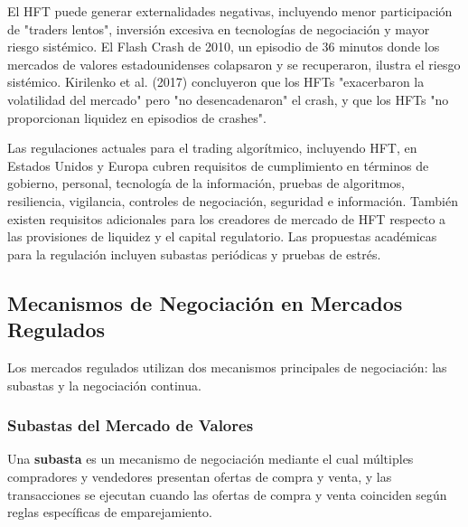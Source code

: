 \begin{proposicion}
El HFT puede generar externalidades negativas, incluyendo menor participación de "traders lentos", inversión excesiva en tecnologías de negociación y mayor riesgo sistémico. El Flash Crash de 2010, un episodio de 36 minutos donde los mercados de valores estadounidenses colapsaron y se recuperaron, ilustra el riesgo sistémico. Kirilenko et al. (2017) concluyeron que los HFTs "exacerbaron la volatilidad del mercado" pero "no desencadenaron" el crash, y que los HFTs "no proporcionan liquidez en episodios de crashes".
\end{proposicion}

\begin{proposicion}
Las regulaciones actuales para el trading algorítmico, incluyendo HFT, en Estados Unidos y Europa cubren requisitos de cumplimiento en términos de gobierno, personal, tecnología de la información, pruebas de algoritmos, resiliencia, vigilancia, controles de negociación, seguridad e información. También existen requisitos adicionales para los creadores de mercado de HFT respecto a las provisiones de liquidez y el capital regulatorio. Las propuestas académicas para la regulación incluyen subastas periódicas y pruebas de estrés.
\end{proposicion}

\subsection{Mecanismos de Negociación en Mercados Regulados}

Los mercados regulados utilizan dos mecanismos principales de negociación: las subastas y la negociación continua.

\subsubsection{Subastas del Mercado de Valores}

\begin{definicion}[Subasta]
Una \textbf{subasta} es un mecanismo de negociación mediante el cual múltiples compradores y vendedores presentan ofertas de compra y venta, y las transacciones se ejecutan cuando las ofertas de compra y venta coinciden según reglas específicas de emparejamiento.
\end{definicion}

